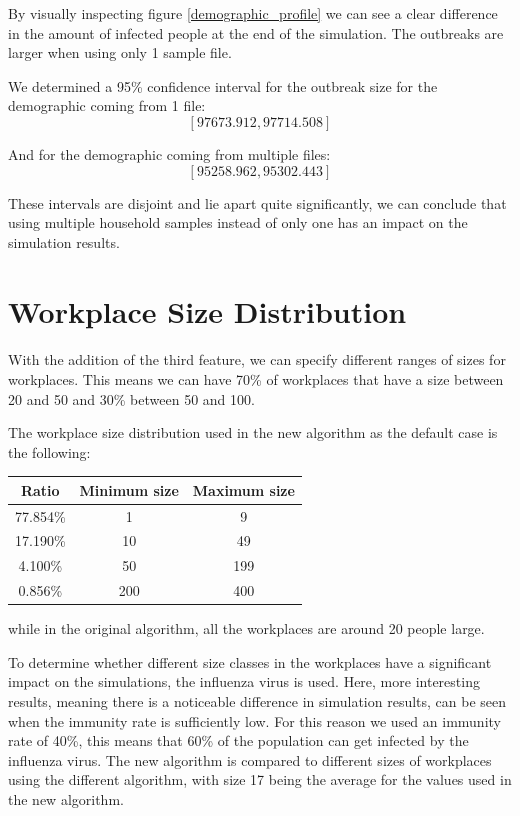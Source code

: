 \documentclass[runningheads]{llncs}
\begin{document}
By visually inspecting figure \ref{demographic_profile} we can see a clear difference in the amount of infected people at the end of the simulation. The outbreaks are larger when using only 1 sample file.

We determined a 95\% confidence interval for the outbreak size for the demographic coming from 1 file:
\[[97673.912, 97714.508]\]

And for the demographic coming from multiple files:
\[[95258.962, 95302.443]\]

These intervals are disjoint and lie apart quite significantly, we can conclude that using multiple household samples instead of only one has an impact on the simulation results.

\section{Workplace Size Distribution}
\paragraph{}
With the addition of the third feature, we can specify different ranges of sizes for workplaces. This means we can have 70\% of workplaces that have a size between 20 and 50 and 30\% between 50 and 100.

The workplace size distribution used in the new algorithm as the default case is the following:
\begin{table}[!h]
	\centering
	\begin{tabular}{|c|c|c|}
		\hline
		Ratio & Minimum size & Maximum size \\\hline
		77.854\% & 1 & 9 \\\hline
		17.190\% & 10 & 49 \\\hline
		4.100\% & 50 & 199 \\\hline
		0.856\% & 200 & 400 \\\hline
	\end{tabular}
\end{table}

while in the original algorithm, all the workplaces are around 20 people large.

To determine whether different size classes in the workplaces have a significant impact on the simulations, the influenza virus is used.
Here, more interesting results, meaning there is a noticeable difference in simulation results, can be seen when the immunity rate is sufficiently low. For this reason we used an immunity rate of 40\%, this means that 60\% of the population can get infected by the influenza virus.
The new algorithm is compared to different sizes of workplaces using the different algorithm, with size 17 being the average for the values used in the new algorithm.
\end{document}
